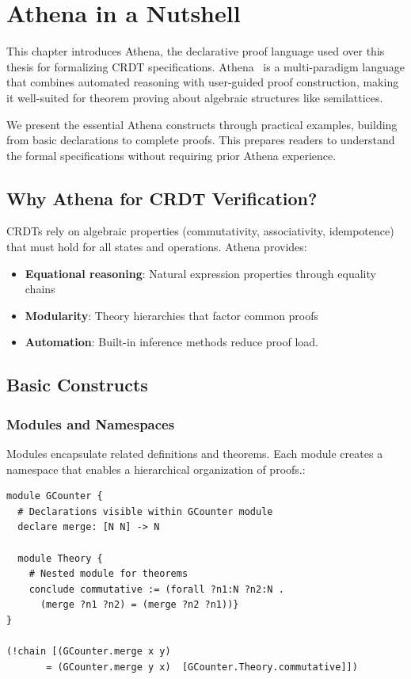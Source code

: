 
\chapter{Athena in a Nutshell}\label{chap:athena}

This chapter introduces Athena, the declarative proof language used over this thesis for formalizing CRDT specifications. Athena~\cite{athenaref} is a multi-paradigm language that combines automated reasoning with user-guided proof construction, making it well-suited for theorem proving about algebraic structures like semilattices.

We present the essential Athena constructs through practical examples, building from basic declarations to complete proofs. This prepares readers to understand the formal specifications without requiring prior Athena experience.

\section{Why Athena for CRDT Verification?}

CRDTs rely on algebraic properties (commutativity, associativity, idempotence) that must hold for all states and operations. Athena provides:

\begin{itemize}
  \item \textbf{Equational reasoning}: Natural expression properties through equality chains
  \item \textbf{Modularity}: Theory hierarchies that factor common proofs
  \item \textbf{Automation}: Built-in inference methods reduce proof load.
\end{itemize}

\section{Basic Constructs}

\subsection{Modules and Namespaces}

Modules encapsulate related definitions and theorems. Each module creates a namespace that enables a hierarchical organization of proofs.:

\begin{lstlisting}[language=Athena,style=athena,caption={Module definition with nested namespace}]
module GCounter {
  # Declarations visible within GCounter module
  declare merge: [N N] -> N
  
  module Theory {
    # Nested module for theorems
    conclude commutative := (forall ?n1:N ?n2:N . 
      (merge ?n1 ?n2) = (merge ?n2 ?n1))}
}

(!chain [(GCounter.merge x y) 
       = (GCounter.merge y x)  [GCounter.Theory.commutative]])
\end{lstlisting}

